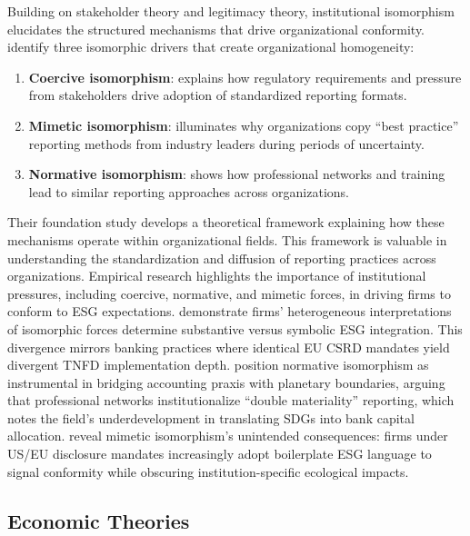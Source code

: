 \documentclass[
  authoryear]{elsarticle}
\begin{document}
Building on stakeholder theory and legitimacy theory, institutional
isomorphism elucidates the structured mechanisms that drive
organizational conformity. \citet{DIMAGGIO1983} identify three
isomorphic drivers that create organizational homogeneity:

\begin{enumerate}
\def\labelenumi{\arabic{enumi}.}
\item
  \textbf{Coercive isomorphism}: explains how regulatory requirements
  and pressure from stakeholders drive adoption of standardized
  reporting formats.
\item
  \textbf{Mimetic isomorphism}: illuminates why organizations copy
  ``best practice'' reporting methods from industry leaders during
  periods of uncertainty.
\item
  \textbf{Normative isomorphism}: shows how professional networks and
  training lead to similar reporting approaches across organizations.
\end{enumerate}

Their foundation study develops a theoretical framework explaining how
these mechanisms operate within organizational fields. This framework is
valuable in understanding the standardization and diffusion of reporting
practices across organizations. Empirical research highlights the
importance of institutional pressures, including coercive, normative,
and mimetic forces, in driving firms to conform to ESG expectations.
\citet{DELMAS2004} demonstrate firms' heterogeneous interpretations of
isomorphic forces determine substantive versus symbolic ESG integration.
This divergence mirrors banking practices where identical EU CSRD
mandates yield divergent TNFD implementation depth.
\citet{BEBBINGTON2018} position normative isomorphism as instrumental in
bridging accounting praxis with planetary boundaries, arguing that
professional networks institutionalize ``double materiality'' reporting,
which notes the field's underdevelopment in translating SDGs into bank
capital allocation. \citet{CHRISTENSEN2021} reveal mimetic isomorphism's
unintended consequences: firms under US/EU disclosure mandates
increasingly adopt boilerplate ESG language to signal conformity while
obscuring institution-specific ecological impacts.

\subsection{Economic Theories}\label{economic-theories}
\end{document}
